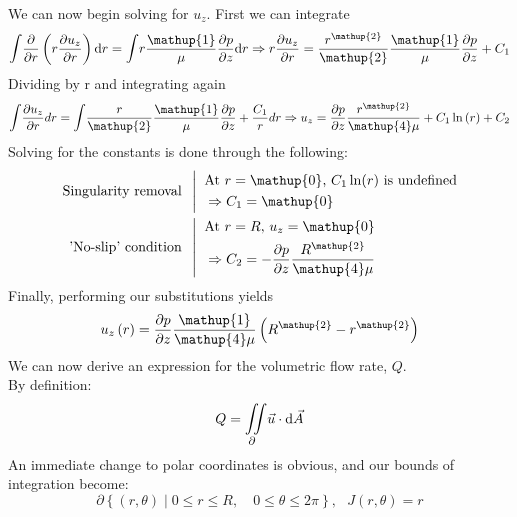 We can now begin solving for \(u_z\). First we can integrate
\begin{equation}
    \mathlarger{\int}\frac{\partial}{\partial r}\left(r\pdv{u_z}{r}\right)\mathrm{d}r = \mathlarger{\int} r \frac{\mathup{1}}{\mu}\pdv{p}{z}\mathrm{d}r \Rightarrow r\pdv{u_z}{r} = \frac{r^\mathup{2}}{\mathup{2}} \frac{\mathup{1}}{\mu}\pdv{p}{z} + C_1
\end{equation}
Dividing by r and integrating again
\begin{equation}
    \mathlarger{\int} \pdv{u_z}{r} dr= \mathlarger{\int} \frac{r}{\mathup{2}} \frac{\mathup{1}}{\mu}\pdv{p}{z} + \frac{C_1}{r}dr
    \Rightarrow u_z = \pdv{p}{z}\frac{r^\mathup{2}}{\mathup{4}\mu} + C_1\ln\left({r}\right) + C_2
\end{equation}
Solving for the constants is done through the following:
\begin{align*}
\text{Singularity removal} \;\; &
    \left| \;\;
    \begin{aligned}
        & \text{At \(r=\mathup{0}\), \(C_1\ln(r)\) is undefined}\\
        & \Rightarrow C_1 = \mathup{0}
    \end{aligned}
    \right\zerodel
    \\
\text{'No-slip' condition}\;\; &
    \left| \;\;
    \begin{aligned}
        & \text{At \(r=R\), \(u_z = \mathup{0}\)} \\
        & \Rightarrow C_2 = -\pdv{p}{z}\frac{R^\mathup{2}}{\mathup{4}\mu}
    \end{aligned}
    \right\zerodel
\end{align*}
Finally, performing our substitutions yields
\begin{equation}
    \label{equations:boundary_layer_velocity_profile}
    u_z\left(r\right) = \pdv{p}{z}\frac{\mathup{1}}{\mathup{4}\mu}\left(R^\mathup{2} - r^\mathup{2}\right)
\end{equation}
\newpage
\noindent We can now derive an expression for the volumetric flow rate, \(Q\). \\
By definition:
\begin{equation}
\label{equations:definition_of_volumetric_flux}
    Q = \mathlarger{\iint\limits_\partial} \vec{u} \cdot \mathrm{d}\vec{A}
\end{equation}
An immediate change to polar coordinates is obvious, and our bounds of integration become:
\begin{equation}
 \partial\left\{(r, \theta) \; \vert \; \mathup{0} \leq r \leq R, \quad \mathup{0} \leq \theta \leq \mathup{2}\pi\right\}\text{,}\;\;\; J\left(r, \theta \right) = r
\end{equation}

